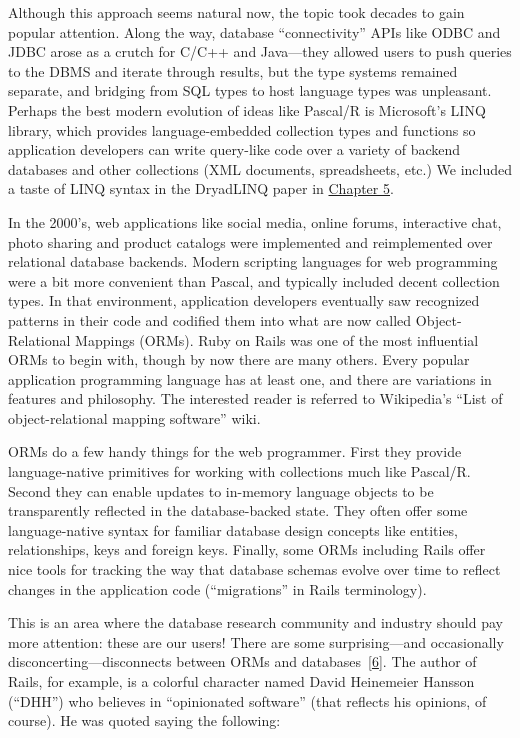 \documentclass[b5paper,11pt,twoside,openright]{book}
\begin{document}
Although this approach seems natural now, the topic took decades to gain
popular attention. Along the way, database ``connectivity'' APIs like
ODBC and JDBC arose as a crutch for C/C++ and Java---they allowed users
to push queries to the DBMS and iterate through results, but the type
systems remained separate, and bridging from SQL types to host language
types was unpleasant. Perhaps the best modern evolution of ideas like
Pascal/R is Microsoft's LINQ library, which provides language-embedded
collection types and functions so application developers can write
query-like code over a variety of backend databases and other
collections (XML documents, spreadsheets, etc.) We included a taste of
LINQ syntax in the DryadLINQ paper in \hyperref[ch5-dataflow]{Chapter 5}.

In the 2000's, web applications like social media, online forums,
interactive chat, photo sharing and product catalogs were implemented
and reimplemented over relational database backends. Modern scripting
languages for web programming were a bit more convenient than Pascal,
and typically included decent collection types. In that environment,
application developers eventually saw recognized patterns in their code
and codified them into what are now called Object-Relational Mappings
(ORMs). Ruby on Rails was one of the most influential ORMs to begin
with, though by now there are many others. Every popular application
programming language has at least one, and there are variations in
features and philosophy. The interested reader is referred to
Wikipedia's ``List of object-relational mapping software'' wiki.

ORMs do a few handy things for the web programmer. First they provide
language-native primitives for working with collections much like
Pascal/R. Second they can enable updates to in-memory language objects
to be transparently reflected in the database-backed state. They often
offer some language-native syntax for familiar database design concepts
like entities, relationships, keys and foreign keys. Finally, some ORMs
including Rails offer nice tools for tracking the way that database
schemas evolve over time to reflect changes in the application code
(``migrations'' in Rails terminology).

This is an area where the database research community and industry
should pay more attention: these are our users! There are some
surprising---and occasionally disconcerting---disconnects between ORMs
and databases~{{[}\protect\hyperlink{ref-feral}{6}{]}}. The author of
Rails, for example, is a colorful character named David Heinemeier
Hansson (``DHH'') who believes in ``opinionated software'' (that
reflects his opinions, of course). He was quoted saying the following:
\end{document}
